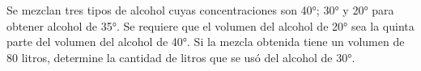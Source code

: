 \noindent
Se mezclan tres tipos de alcohol cuyas concentraciones son 40\!°; 30\!° y 20\!° para obtener alcohol de 35\!°. Se requiere que el volumen del alcohol de 20\!° sea la quinta parte del volumen del alcohol de 40\!°. Si la mezcla obtenida tiene un volumen de 80 litros, determine la cantidad de litros que se usó del alcohol de 30\!°. 